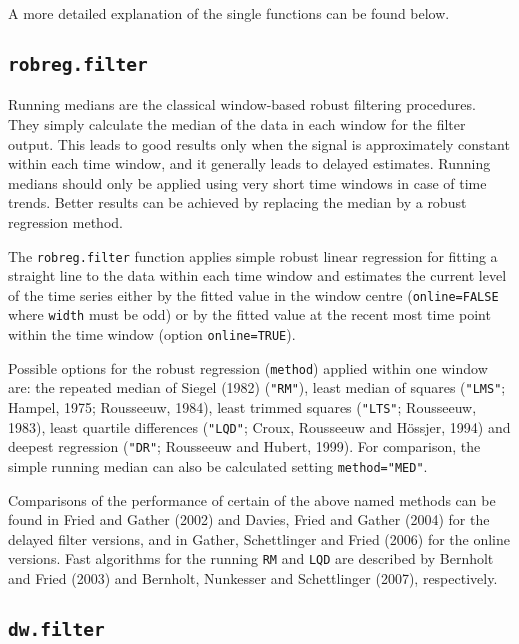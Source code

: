 \documentclass[a4paper]{scrartcl}
\begin{document}
\noindent
A more detailed explanation of the single functions can be found
below.

\newpage
\subsection{\texttt{robreg.filter}}

Running medians are the classical window-based robust filtering
procedures. They simply calculate the median of the data in each
window for the filter output. This leads to good results only when
the signal is approximately constant within each time window, and
it generally leads to delayed estimates. Running medians should
only be applied using very short time windows in case of time
trends. Better results %
can be achieved by replacing the median by a robust regression
method.

The \texttt{robreg.filter} function applies  simple robust linear
regression for fitting a straight line to the data within each time
window and estimates the current level of the time series either by
the fitted value in the window centre (\texttt{online=FALSE} where
\texttt{width} must be odd) or by the fitted value at the recent
most time point within the time window (option
\texttt{online=TRUE}).

Possible options for the robust regression (\texttt{method})
applied within one window are: the repeated median of Siegel
(1982) (\texttt{"RM"}), least median of squares (\texttt{"LMS"};
Hampel, 1975; Rousseeuw, 1984), least trimmed squares
(\texttt{"LTS"}; Rousseeuw, 1983), least quartile differences
(\texttt{"LQD"}; Croux, Rousseeuw and H\"{o}ssjer, 1994) and deepest
regression (\texttt{"DR"}; Rousseeuw and Hubert, 1999). For
comparison, the simple running median can also be calculated
setting \texttt{method="MED"}.

Comparisons of the performance of certain of the above named
methods can be found in Fried and Gather (2002) and Davies, Fried
and Gather (2004)  for the delayed filter versions, and in Gather,
Schettlinger and Fried (2006) for the online versions. Fast
algorithms for the running \texttt{RM} and \texttt{LQD} are
described by Bernholt and Fried (2003) and Bernholt, Nunkesser and
Schettlinger (2007), respectively.

\subsection{\texttt{dw.filter}}
\end{document}

